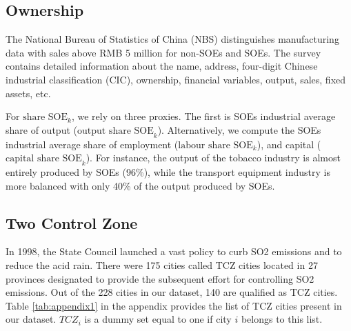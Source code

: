 \documentclass[12pt]{article}
\begin{document}
\subsection{Ownership} \label{sec:ownership}

The National Bureau of Statistics of China (NBS) distinguishes manufacturing data with sales above RMB 5 million for non-SOEs and SOEs. The survey contains detailed information about the name, address, four-digit Chinese industrial classification (CIC), ownership, financial variables, output, sales, fixed assets, etc. 

For $\text{share SOE}_k$, we rely on three proxies. The first is SOEs industrial average share of output ($\text{output share SOE}_k$). Alternatively, we compute the SOEs industrial average share of employment ($\text{labour share SOE}_k$), and capital ($\text{capital share SOE}_k$). For instance, the output of the tobacco industry is almost entirely produced by SOEs (96\%), while the transport equipment industry is more balanced with only 40\% of the output produced by SOEs.

\subsection{Two Control Zone} \label{sec:tcz}

In 1998, the State Council launched a vast policy to curb SO2 emissions and to reduce the acid rain. There were 175 cities called TCZ cities located in 27 provinces designated to provide the subsequent effort for controlling SO2 emissions. Out of the 228 cities in our dataset, 140 are qualified as TCZ cities. Table \ref{tab:appendix1} in the appendix provides the list of TCZ cities present in our dataset. $T C Z_{i}$ is a dummy set equal to one if city $i$ belongs to this list. 
\end{document}
